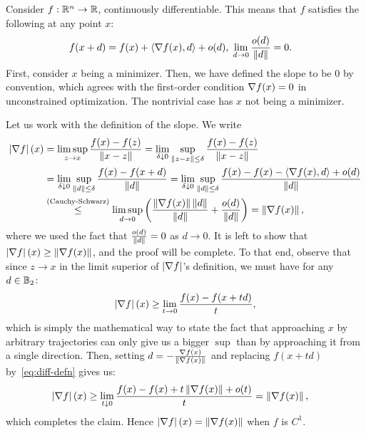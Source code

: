 \documentclass[10pt]{article}
\begin{document}
\begin{Exercise}
	\label{ex:p2}
	Consider $f: \mathbb{R}^n \to \mathbb{R}$, continuously differentiable. This means that
	$f$ satisfies the following at any point $x$:
	\begin{align}
		f(x + d) &= f(x) + \left\langle \nabla f(x), d \right\rangle + o(d), \;
		\lim_{d \to 0} \frac{o(d)}{\left \| d \right \|} = 0.
		\label{eq:diff-defn}
	\end{align}
	First, consider $x$ being a minimizer. Then, we have defined the slope to
	be $0$ by convention, which agrees with the first-order condition $\nabla
	f(x) = 0$ in unconstrained optimization. The nontrivial case has $x$ not
	being a minimizer.

	Let us work with the definition of the slope. We write
	\begin{align*}
		\left| \nabla f \right|(x) &= \limsup_{z \to x} \frac{f(x) - f(z)}{\left \| x - z \right \|}
		= \lim_{\delta \downarrow 0} \sup_{\left \| z - x \right \| \leq \delta} \frac{f(x) -
		f(z)}{\left \| x - z \right \|} \\
			&= \lim_{\delta \downarrow 0} \sup_{\left \| d \right \| \leq \delta}
			\frac{f(x) - f(x + d)}{\left \| d \right \|} =
				\lim_{\delta \downarrow 0} \sup_{\left \| d \right \| \leq \delta}
			\frac{f(x) - f(x) - \left\langle \nabla f(x), d \right\rangle + o(d)}{\left \| d \right \|} \\
			&\overset{(\text{Cauchy-Schwarz})}{\leq} \limsup_{d \to 0} \left(
				\frac{\left \| \nabla f(x) \right \| \left \| d \right \|}{\left \| d \right \|} +
			  	\frac{o(d)}{\left \| d \right \|} \right) = \left \| \nabla f(x) \right \|,
	\end{align*}
	where we used the fact that $\frac{o(d)}{\left \| d \right \|} = 0$ as $d \to 0$.
	It is left to show that $\left| \nabla f \right|(x) \geq \left \| \nabla f(x) \right \|$, and the
	proof will be complete. To that end, observe that since $z \to x$ in the
	limit superior of $\left| \nabla f \right|$'s definition, we must have for any
	$d \in \mathbb{B}_2$:
	\[
		\left| \nabla f \right|(x) \geq \lim_{t \to 0} \frac{f(x) - f(x + td)}{t},
	\]
	which is simply the mathematical way to state the fact that approaching $x$
	by arbitrary trajectories can only give us a bigger $\sup$ than by
	approaching it from a single direction. Then, setting $d = -\frac{\nabla
	f(x)}{\left \| \nabla f(x) \right \|}$ and replacing $f(x + td)$ by~\cref{eq:diff-defn}
	gives us:
	\begin{align*}
		\left| \nabla f \right|(x) &\geq
		\lim_{t \downarrow 0} \frac{f(x) - f(x) + t \left \| \nabla f(x) \right \| + o(t)}{t}
			= \left \| \nabla f(x) \right \|,
	\end{align*}
	which completes the claim. Hence $\left| \nabla f \right|(x) = \left \| \nabla f(x) \right \|$
	when $f$ is $C^1$.
\end{Exercise}
\end{document}
